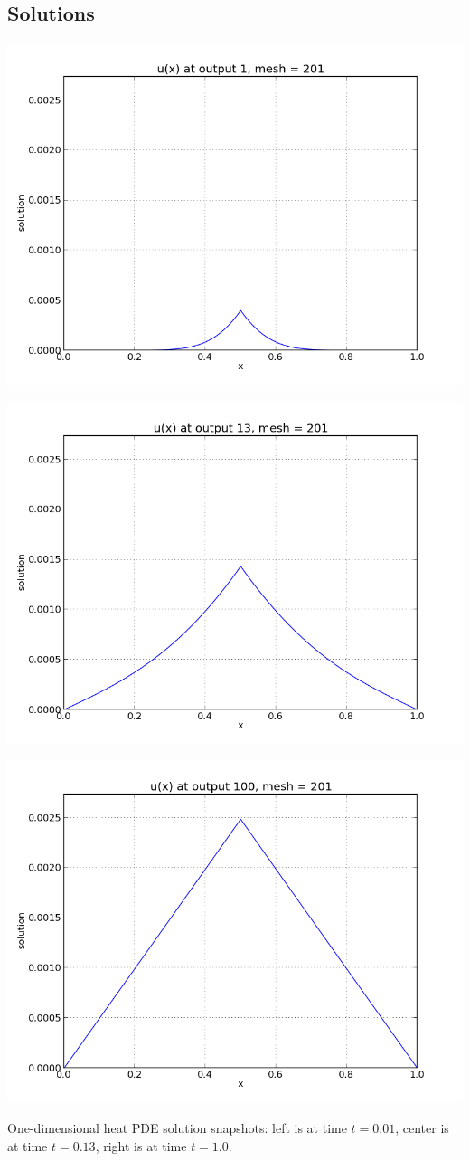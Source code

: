 \documentclass[letterpaper,10pt,english]{sphinxmanual}
\begin{document}
\subsection{Solutions}
\label{c_serial:id27}
\includegraphics[width=0.300\linewidth]{plot-ark_heat1d_1.png}

\includegraphics[width=0.300\linewidth]{plot-ark_heat1d_2.png}

\includegraphics[width=0.300\linewidth]{plot-ark_heat1d_3.png}

One-dimensional heat PDE solution snapshots: left is at time \(t=0.01\),
center is at time \(t=0.13\), right is at time \(t=1.0\).
\end{document}
